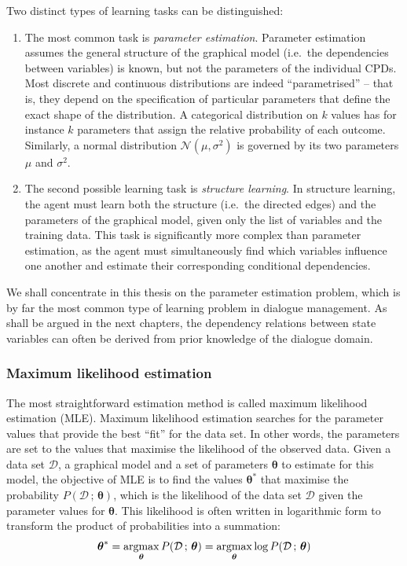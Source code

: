Two distinct types of learning tasks can be distinguished:
\begin{enumerate}
\item The most common task is \textit{parameter estimation}.  Parameter estimation assumes the general structure of the graphical model (i.e.\ the dependencies between variables) is known, but not the parameters of the individual CPDs. Most discrete and continuous distributions are indeed ``parametrised'' -- that is, they depend on the specification of particular parameters that define the exact shape of the distribution. A categorical distribution on $k$ values has for instance $k$ parameters that assign the relative probability of each outcome.  Similarly, a normal distribution $\mathcal{N}(\mu,\sigma^2)$ is governed by its two parameters $\mu$ and $\sigma^2$. 

\item The second possible learning task is \textit{structure learning}.  In structure learning, the agent must learn both the structure (i.e.\ the directed edges) and the parameters of the graphical model, given only the list of variables and the training data.  This task is significantly more complex than parameter estimation, as the agent must simultaneously find which variables influence one another and estimate their corresponding conditional dependencies. 
\end{enumerate}

We shall concentrate in this thesis on the parameter estimation problem, which is by far the most common type of learning problem in dialogue management. As shall be argued in the next chapters, the dependency relations between state variables can often be derived from prior knowledge of the dialogue domain.

\subsubsection*{Maximum likelihood estimation}
The most straightforward estimation method is called maximum likelihood estimation (MLE). Maximum likelihood estimation searches for the parameter values that provide the best ``fit'' for the data set.  In other words, the parameters are set to the values that maximise the likelihood of the observed data.  Given a data set $\mathcal{D}$, a graphical model and a set of parameters $\boldsymbol\theta$ to estimate for this model, the objective of MLE is to find the values $\boldsymbol\theta^*$  that maximise the probability $P(\mathcal{D} \, ;  \, \boldsymbol\theta)$, which is the likelihood of the data set $\mathcal{D}$ given the parameter values for $\boldsymbol\theta$. This likelihood is often written in logarithmic form to transform the product of probabilities into a summation: 
\begin{equation}
\boldsymbol\theta^* = \argmax_{\boldsymbol\theta} P(\mathcal{D}  \, ; \, \boldsymbol\theta) = \argmax_{\boldsymbol\theta} \log P(\mathcal{D}  \,  ;  \, \boldsymbol\theta)
\end{equation}


